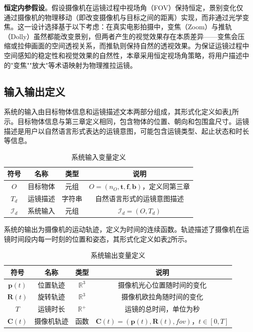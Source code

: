 \textbf{恒定内参假设}。假设摄像机在运镜过程中视场角（FOV）保持恒定，景别变化仅通过摄像机的物理移动（即改变摄像机与目标之间的距离）实现，而非通过光学变焦。这一设计选择基于以下考虑：在真实电影拍摄中，变焦（Zoom）与推轨（Dolly）虽然都能改变景别，但两者产生的视觉效果存在本质差异——变焦会压缩或拉伸画面的空间透视关系，而推轨则保持自然的透视效果\cite{arijon1976grammar}。为保证运镜过程中空间感知的稳定性和视觉效果的自然性，本章采用恒定视场角策略，将用户描述中的"变焦""放大"等术语映射为物理推拉运镜。

\subsection{输入输出定义}

系统的输入由目标物体信息和运镜描述文本两部分组成，其形式化定义如表\ref{tab:dynamic_input}所示。目标物体信息与第三章定义相同，包含物体的位置、朝向和包围盒尺寸。运镜描述是用户以自然语言形式表达的运镜意图，可能包含运镜类型、起止状态和时长等信息。

\begin{table}[htbp]
\centering
\caption{系统输入变量定义}
\label{tab:dynamic_input}
\begin{tabular}{cccc}
\toprule
符号 & 名称 & 类型 & 说明 \\
\midrule
$O$ & 目标物体 & 元组 & $O = (n_O, \mathbf{t}, \mathbf{f}, \mathbf{b})$，定义同第三章 \\
$T_d$ & 运镜描述 & 字符串 & 自然语言形式的运镜意图描述 \\
$\mathcal{I}_d$ & 系统输入 & 元组 & $\mathcal{I}_d = (O, T_d)$ \\
\bottomrule
\end{tabular}
\end{table}

系统的输出为摄像机的运动轨迹，定义为时间的连续函数。轨迹描述了摄像机在运镜时间段内每一时刻的位置和姿态，其形式化定义如表\ref{tab:dynamic_output}所示。

\begin{table}[htbp]
\centering
\caption{系统输出变量定义}
\label{tab:dynamic_output}
\begin{tabular}{cccc}
\toprule
符号 & 名称 & 类型 & 说明 \\
\midrule
$\mathbf{p}(t)$ & 位置轨迹 & $\mathbb{R}^3$ & 摄像机光心位置随时间的变化 \\
$\mathbf{R}(t)$ & 旋转轨迹 & $\mathbb{R}^3$ & 摄像机欧拉角随时间的变化 \\
$T$ & 运镜时长 & $\mathbb{R}^+$ & 运镜的总时间，单位为秒 \\
$\mathbf{C}(t)$ & 摄像机轨迹 & 函数 & $\mathbf{C}(t) = (\mathbf{p}(t), \mathbf{R}(t), \textit{fov})$，$t \in [0, T]$ \\
\bottomrule
\end{tabular}
\end{table}

